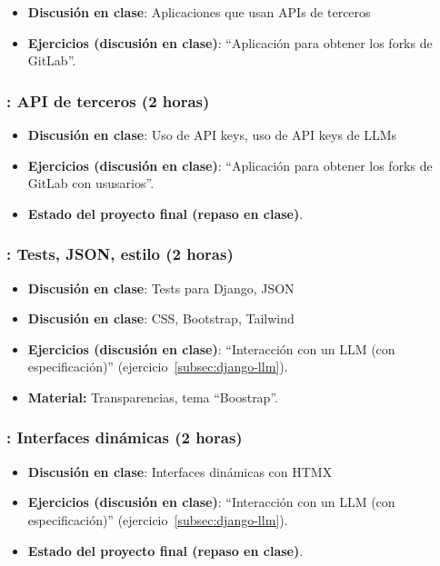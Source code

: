 \documentclass[a4paper,12pt]{article}
\begin{document}
\begin{itemize}
\item \textbf{Discusión en clase}: Aplicaciones que usan APIs de terceros
\item \textbf{Ejercicios (discusión en clase)}: ``Aplicación para obtener los forks de GitLab''.
\end{itemize}

\subsubsection{\martesL: API de terceros (2 horas)}
\label{cal:martesL}

\begin{itemize}
\item \textbf{Discusión en clase}: Uso de API keys, uso de API keys de LLMs
\item \textbf{Ejercicios (discusión en clase)}: ``Aplicación para obtener los forks de GitLab con ususarios''.
\item \textbf{Estado del proyecto final (repaso en clase)}.
\end{itemize}

\subsubsection{\lunesM: Tests, JSON, estilo (2 horas)}
\label{cal:lunesM}

\begin{itemize}
\item \textbf{Discusión en clase}: Tests para Django, JSON
\item \textbf{Discusión en clase}: CSS, Bootstrap, Tailwind
\item \textbf{Ejercicios (discusión en clase)}: ``Interacción con un LLM (con especificación)''  (ejercicio~\ref{subsec:django-llm}).
 \item \textbf{Material:} Transparencias, tema ``Boostrap''.
\end{itemize}

\subsubsection{\martesM: Interfaces dinámicas (2 horas)}
\label{cal:martesM}

\begin{itemize}
\item \textbf{Discusión en clase}: Interfaces dinámicas con HTMX
\item \textbf{Ejercicios (discusión en clase)}: ``Interacción con un LLM (con especificación)'' (ejercicio~\ref{subsec:django-llm}).
\item \textbf{Estado del proyecto final (repaso en clase)}.
\end{itemize}
\end{document}
